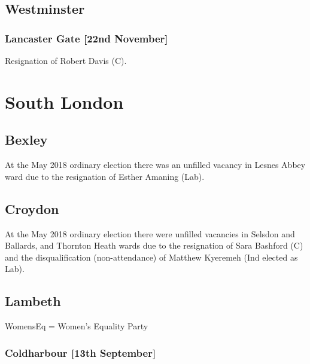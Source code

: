 \documentclass[a4paper,openany]{book}
\begin{document}
\begin{resultsiii}
\subsection*{Westminster}

\subsubsection*{Lancaster Gate
	\hspace*{\fill}\nolinebreak[1]%
	\enspace\hspace*{\fill}
	[22nd November]}


Resignation of Robert Davis (C).

\section{South London}

\subsection*{Bexley}

At the May 2018 ordinary election there was an unfilled vacancy in Lesnes Abbey ward due to the resignation of Esther Amaning (Lab).

\subsection*{Croydon}

At the May 2018 ordinary election there were unfilled vacancies in Selsdon and Ballards, and Thornton Heath wards due to the resignation of Sara Bashford (C) and the disqualification (non-attendance) of Matthew Kyeremeh (Ind elected as Lab).

\subsection*{Lambeth}

WomensEq = Women's Equality Party

\subsubsection*{Coldharbour
\hspace*{\fill}\nolinebreak[1]%
\enspace\hspace*{\fill}
[13th September]}


\end{resultsiii}
\end{document}
